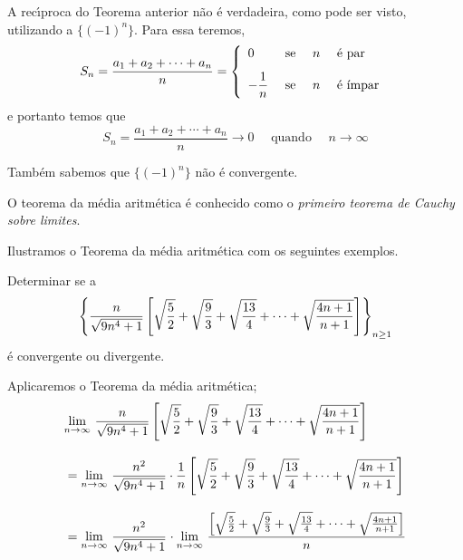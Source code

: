 \begin{obs}
A rec\'{\i}proca do Teorema anterior n\~{a}o \'{e} verdadeira, como pode ser visto, 
utilizando a \seq $\{(-1)^n\}$. Para essa \seq teremos,
\begin{equation*}
S_n=\frac{a_1+a_2+\cdots+a_n}{n}=\left\{
                                   \begin{array}{ll}
                                     0 & \hbox{ se }\quad n \quad \text{ \'{e} par } \\[2ex]
                        -\dfrac{1}{n}  & \hbox{ se }\quad n \quad \text{ \'{e} \'{\i}mpar }
                                   \end{array}
                                 \right.
\end{equation*}
e portanto temos que
\begin{equation*}
 S_n=\frac{a_1+a_2+\cdots+a_n}{n}\to 0 \quad \text{ quando }\quad n\to\infty
\end{equation*}

Tamb\'{e}m sabemos que $\{(-1)^n\}$ n\~{a}o \'{e} convergente.
\end{obs}
O teorema da m\'{e}dia aritm\'{e}tica \'{e} conhecido como o \emph{primeiro teorema de Cauchy 
sobre limites}.

Ilustramos o Teorema da m\'{e}dia aritm\'{e}tica com os seguintes exemplos.

\begin{exem}
Determinar se a \seq
\begin{equation*}
  \displaystyle{\left\{\frac{n}{\sqrt{9n^4+1}}\left[\sqrt{\frac{5}{2}}+\sqrt{\frac{9}{3}}+\sqrt{\frac{13}{4}}+
   \cdots+\sqrt{\frac{4n+1}{n+1}} \right]_{}\right\}_{n\geq 1}}
\end{equation*}
\'{e} convergente ou divergente.
\end{exem}

\solo Aplicaremos o Teorema da m\'{e}dia aritm\'{e}tica;
\begin{align*}
  &\displaystyle{\lim_{n\to \infty}\,{\frac{n}{\sqrt{9n^4+1}}\left[\sqrt{\frac{5}{2}}+\sqrt{\frac{9}{3}}+\sqrt{\frac{13}{4}}+
   \cdots+\sqrt{\frac{4n+1}{n+1}} \right]}_{}} \\[2ex]
  &=\displaystyle{\lim_{n\to \infty}\,{\frac{n^2}{\sqrt{9n^4+1}}\cdot \frac{1}{n}\left[\sqrt{\frac{5}{2}}+\sqrt{\frac{9}{3}}+\sqrt{\frac{13}{4}}+
   \cdots+\sqrt{\frac{4n+1}{n+1}} \right]}_{}}\\[2ex]
   &=\displaystyle{\lim_{n\to \infty}\,{\frac{n^2}{\sqrt{9n^4+1}}}_{}}\cdot\displaystyle{\lim_{n\to \infty}\,{\frac{\left[\sqrt{\frac{5}{2}}+\sqrt{\frac{9}{3}}+\sqrt{\frac{13}{4}}+
   \cdots+\sqrt{\frac{4n+1}{n+1}} \right]}{n}}_{}}
\end{align*}

